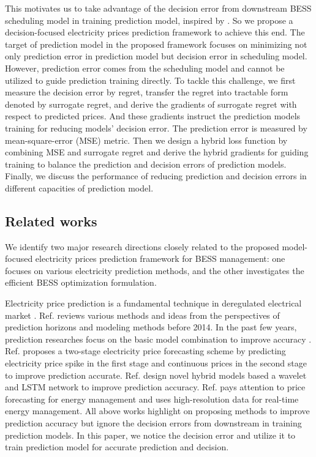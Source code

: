 \documentclass[journal]{IEEEtran}
\begin{document}
This motivates us to take advantage of the decision error from downstream BESS scheduling model in training prediction model, inspired by \cite{Elmachtoub2020, Donti2017,Lu2020}. So we propose a decision-focused electricity prices prediction framework to achieve this end. The target of prediction model in the proposed framework focuses on minimizing not only prediction error in prediction model but decision error in scheduling model. However, prediction error comes from the scheduling model and cannot be utilized to guide prediction training directly. To tackle this challenge, we first measure the decision error by regret, transfer the regret into tractable form denoted by surrogate regret, and derive the gradients of surrogate regret with respect to predicted prices. And these gradients instruct the prediction models training for reducing models' decision error. The prediction error is measured by mean-square-error (MSE) metric. Then we design a hybrid loss function by combining MSE and surrogate regret and derive the hybrid gradients for guiding training to balance the prediction and decision errors of prediction models. Finally, we discuss the performance of reducing prediction and decision errors in different capacities of prediction model. 

\subsection{Related works}

We identify two major research directions closely related to the proposed model-focused electricity prices prediction framework for BESS management: one focuses on various electricity prediction methods, and the other investigates the efficient BESS optimization formulation.

Electricity price prediction is a fundamental technique in deregulated electrical market \cite{Weron2014,Shi2021,Chang2019,Qiao2020,Gonzalez2018,Diaz2019,Peng2018}. Ref. \cite{Weron2014} reviews various methods and ideas from the perspectives of prediction horizons and modeling methods before 2014. In the past few years, prediction researches focus on the basic model combination to improve accuracy \cite{Shi2021,Chang2019,Qiao2020,Gonzalez2018,Diaz2019,Peng2018}. Ref. \cite{Shi2021} proposes a two-stage electricity price forecasting scheme by predicting electricity price spike in the first stage and continuous prices in the second stage to improve prediction accurate. Ref. \cite{Chang2019,Qiao2020} design novel hybrid models based a wavelet and LSTM network to improve prediction accuracy. Ref. \cite{Chitsaz2018} pays attention to price forecasting for energy management and uses high-resolution data for real-time energy management. All above works highlight on proposing methods to improve prediction accuracy but ignore the decision errors from downstream in training prediction models. In this paper, we notice the decision error and utilize it to train prediction model for accurate prediction and decision.
\end{document}
